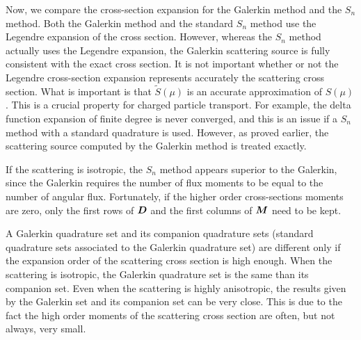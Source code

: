 Now, we compare the cross-section expansion for the Galerkin method and
the $S_n$ method. Both the Galerkin method and the standard $S_n$ method use
the Legendre expansion of the cross section. However, whereas the $S_n$ method
actually uses the Legendre expansion, the Galerkin scattering source is
fully consistent with the exact cross section. It is not
important whether or not the Legendre cross-section expansion represents
accurately the scattering cross section. What is important is that
$\tilde{S}(\mu)$ is an accurate approximation of $S(\mu)$. This is a crucial 
property for charged particle transport. For example, the delta
function expansion of finite degree is never converged, and this is an issue if a 
$S_n$ method with a standard quadrature is used. However, as proved earlier, 
the scattering source computed by the Galerkin method is treated exactly.

If the scattering is isotropic, the $S_n$ method appears superior to the
Galerkin, since the Galerkin requires the number of flux moments to be equal
to the number of angular flux. Fortunately, if the higher order cross-sections
moments are zero, only the first rows of $\boldsymbol{D}$ and the first columns of
$\boldsymbol{M}$ need to be kept.

A Galerkin quadrature set and its companion quadrature sets (standard
quadrature sets associated to the Galerkin quadrature set) are different only
if the expansion order of the scattering cross section is high enough. When the 
scattering is isotropic, the Galerkin quadrature set is the same than its
companion set. Even when the scattering is highly anisotropic, the results
given by the Galerkin set and its companion set can be very close. This is due
to the fact the high order moments of the scattering cross section are often,
but not always, very small.
